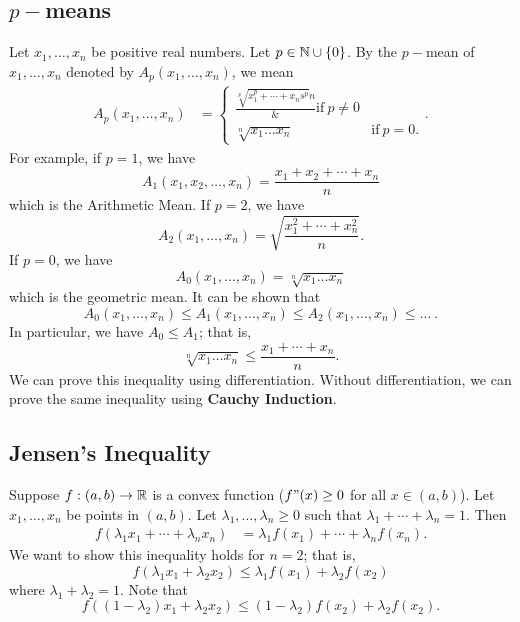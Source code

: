 \documentclass[a4paper]{report}
\begin{document}
\subsection{\( p- \)means}
Let \( {x}_{1}, \dots, {x}_{n}  \) be positive real numbers. Let \( p \in \mathbb{N} \cup \{ 0  \}  \). By the \( p- \)mean of \( {x}_{1}, \dots, {x}_{n} \) denoted by \( {A}_{p}({x}_{1}, \dots, {x}_{n}) \), we mean
\begin{align*}
    {A}_{p}({x}_{1}, \dots, {x}_{n}) &= 
    \begin{cases}
        \frac{ \sqrt[p]{  x^{p}_1 + \cdots + {x}_{n}s^{p} }{ n }  } &\text{if} \ p \neq 0 \\
        \sqrt[n]{{x}_{1} \dots {x}_{n} } &\text{if} \  p = 0. 
    \end{cases}.
\end{align*}
For example, if \( p = 1  \), we have
\[  {A}_{1}({x}_{1}, {x}_{2}, \dots, {x}_{n}) = \frac{ {x}_{1} + {x}_{2} + \cdots + {x}_{n}  }{ n }   \]
which is the Arithmetic Mean. If \( p = 2  \), we have
\[  {A}_{2}({x}_{1}, \dots, {x}_{n}) = \sqrt{ \frac{ {x}_{1}^{2} + \cdots + {x}_{n}^{2} }{ n }  }.  \]
If \( p = 0  \), we have
\[  {A}_{0}({x}_{1}, \dots, {x}_{n}) = \sqrt[n]{ {x}_{1} \dots {x}_{n}  } \]
which is the geometric mean. It can be shown that
\[  {A}_{0}({x}_{1}, \dots, {x}_{n}) \leq {A}_{1}({x}_{1}, \dots, {x}_{n}) \leq {A}_{2}({x}_{1}, \dots, {x}_{n}) \leq \dots \ .  \]
In particular, we have \( {A}_{0} \leq {A}_{1} \); that is, 
\[  \sqrt[n]{{x}_{1} \dots {x}_{n}  } \leq \frac{ {x}_{1} + \cdots + {x}_{n} }{ n } \tag{AM-GM Inequality}. \]
We can prove this inequality using differentiation. Without differentiation, we can prove the same inequality using \textbf{Cauchy Induction}.

\subsection{Jensen's Inequality}

Suppose \( f: (a,b) \to \mathbb{R}  \) is a convex function (\( f"(x) \geq 0  \) for all \( x \in (a,b) \)). Let \( {x}_{1}, \dots, {x}_{n}  \) be points in \( (a,b) \). Let \( {\lambda}_{1}, \dots, {\lambda}_{n} \geq 0  \) such that \( {\lambda}_{1} + \cdots + {\lambda}_{n} = 1  \). Then   
\begin{align*}
    f({\lambda}_{1} {x}_{1} + \cdots + {\lambda}_{n} {x}_{n}) &= {\lambda}_{1} f({x}_{1}) + \cdots + {\lambda}_{n} f({x}_{n}).
\end{align*}
We want to show this inequality holds for \( n = 2  \); that is, 
\[  f({\lambda}_{1} {x}_{1} + {\lambda}_{2} {x}_{2}) \leq {\lambda}_{1} f({x}_{1}) + {\lambda}_{2} f({x}_{2}) \]
where \( {\lambda}_{1} + {\lambda}_{2} = 1  \). Note that 
\[  f((1 - {\lambda}_{2}){x}_{1} + {\lambda}_{2} {x}_{2}) \leq (1 - {\lambda}_{2})f({x}_{2}) + {\lambda}_{2} f({x}_{2}). \]
\end{document}
